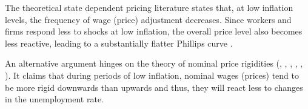 \documentclass[12pt]{article}
\begin{document}
\begin{appendices}
The theoretical state dependent pricing literature states that, at low inflation levels, the frequency of wage (price) adjustment decreases. Since workers and firms respond less to shocks at low inflation, the overall price level also becomes less reactive, leading to a substantially flatter Phillips curve \citep{Costain2022}.

An alternative argument hinges on the theory of nominal price rigidities (\cite{Tobin1972}, \cite{Akerlof1996}, \cite{Benigno2011}, \cite{Daly2014}, \cite{Gagnon2019}, \cite{Linde2019}). It claims that during periods of low inflation, nominal wages (prices) tend to be more rigid downwards than upwards and thus, they will react less to changes in the unemployment rate.



\clearpage

\end{appendices}
\end{document}
